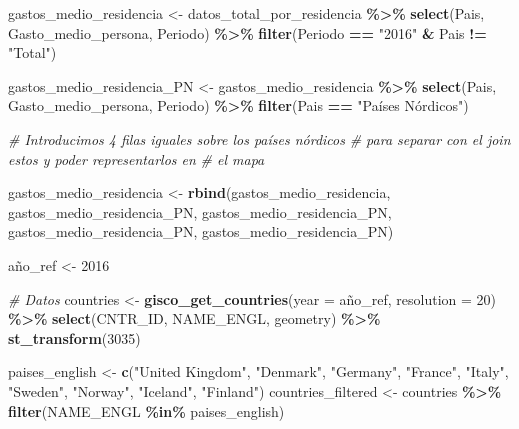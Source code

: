 \documentclass[data,article,submit,moreauthors,pdftex]{Definitions/mdpi}
\newenvironment{Shaded}{\begin{snugshade}}{\end{snugshade}}
\newcommand{\AttributeTok}[1]{\textcolor[rgb]{0.13,0.29,0.53}{#1}}
\newcommand{\CommentTok}[1]{\textcolor[rgb]{0.56,0.35,0.01}{\textit{#1}}}
\newcommand{\DecValTok}[1]{\textcolor[rgb]{0.00,0.00,0.81}{#1}}
\newcommand{\FunctionTok}[1]{\textcolor[rgb]{0.13,0.29,0.53}{\textbf{#1}}}
\newcommand{\NormalTok}[1]{#1}
\newcommand{\OtherTok}[1]{\textcolor[rgb]{0.56,0.35,0.01}{#1}}
\newcommand{\SpecialCharTok}[1]{\textcolor[rgb]{0.81,0.36,0.00}{\textbf{#1}}}
\newcommand{\StringTok}[1]{\textcolor[rgb]{0.31,0.60,0.02}{#1}}
\begin{document}
\begin{Shaded}
\begin{Highlighting}[]
\NormalTok{gastos\_medio\_residencia }\OtherTok{\textless{}{-}}\NormalTok{ datos\_total\_por\_residencia }\SpecialCharTok{\%\textgreater{}\%}
    \FunctionTok{select}\NormalTok{(Pais, Gasto\_medio\_persona, Periodo) }\SpecialCharTok{\%\textgreater{}\%}
    \FunctionTok{filter}\NormalTok{(Periodo }\SpecialCharTok{==} \StringTok{"2016"} \SpecialCharTok{\&}\NormalTok{ Pais }\SpecialCharTok{!=} \StringTok{"Total"}\NormalTok{)}

\NormalTok{gastos\_medio\_residencia\_PN }\OtherTok{\textless{}{-}}\NormalTok{ gastos\_medio\_residencia }\SpecialCharTok{\%\textgreater{}\%}
    \FunctionTok{select}\NormalTok{(Pais, Gasto\_medio\_persona, Periodo) }\SpecialCharTok{\%\textgreater{}\%}
    \FunctionTok{filter}\NormalTok{(Pais }\SpecialCharTok{==} \StringTok{"Países Nórdicos"}\NormalTok{)}

\CommentTok{\# Introducimos 4 filas iguales sobre los países nórdicos}
\CommentTok{\# para separar con el join estos y poder representarlos en}
\CommentTok{\# el mapa}

\NormalTok{gastos\_medio\_residencia }\OtherTok{\textless{}{-}} \FunctionTok{rbind}\NormalTok{(gastos\_medio\_residencia, gastos\_medio\_residencia\_PN,}
\NormalTok{    gastos\_medio\_residencia\_PN, gastos\_medio\_residencia\_PN, gastos\_medio\_residencia\_PN)}

\NormalTok{año\_ref }\OtherTok{\textless{}{-}} \DecValTok{2016}

\CommentTok{\# Datos}
\NormalTok{countries }\OtherTok{\textless{}{-}} \FunctionTok{gisco\_get\_countries}\NormalTok{(}\AttributeTok{year =}\NormalTok{ año\_ref, }\AttributeTok{resolution =} \DecValTok{20}\NormalTok{) }\SpecialCharTok{\%\textgreater{}\%}
    \FunctionTok{select}\NormalTok{(CNTR\_ID, NAME\_ENGL, geometry) }\SpecialCharTok{\%\textgreater{}\%}
    \FunctionTok{st\_transform}\NormalTok{(}\DecValTok{3035}\NormalTok{)}

\NormalTok{paises\_english }\OtherTok{\textless{}{-}} \FunctionTok{c}\NormalTok{(}\StringTok{"United Kingdom"}\NormalTok{, }\StringTok{"Denmark"}\NormalTok{, }\StringTok{"Germany"}\NormalTok{, }\StringTok{"France"}\NormalTok{,}
    \StringTok{"Italy"}\NormalTok{, }\StringTok{"Sweden"}\NormalTok{, }\StringTok{"Norway"}\NormalTok{, }\StringTok{"Iceland"}\NormalTok{, }\StringTok{"Finland"}\NormalTok{)}
\NormalTok{countries\_filtered }\OtherTok{\textless{}{-}}\NormalTok{ countries }\SpecialCharTok{\%\textgreater{}\%}
    \FunctionTok{filter}\NormalTok{(NAME\_ENGL }\SpecialCharTok{\%in\%}\NormalTok{ paises\_english)}


\end{Highlighting}
\end{Shaded}
\end{document}
